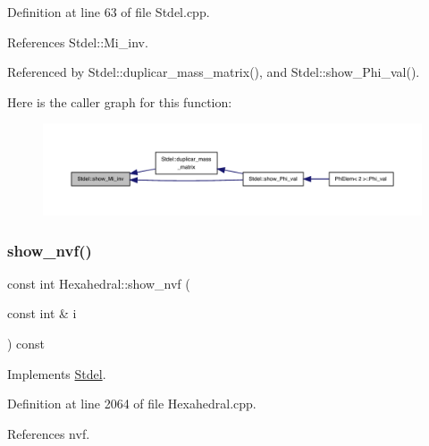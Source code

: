 Definition at line 63 of file Stdel.\+cpp.



References Stdel\+::\+Mi\+\_\+inv.



Referenced by Stdel\+::duplicar\+\_\+mass\+\_\+matrix(), and Stdel\+::show\+\_\+\+Phi\+\_\+val().

Here is the caller graph for this function\+:
\nopagebreak
\begin{figure}[H]
\begin{center}
\leavevmode
\includegraphics[width=350pt]{classStdel_a11bf2897170ada9a9dd8f641a39585e5_icgraph}
\end{center}
\end{figure}
\mbox{\label{classHexahedral_a92b12c1e273117e9cc481e3a7204d90a}} 
\subsubsection{\texorpdfstring{show\+\_\+nvf()}{show\_nvf()}}
{\footnotesize\ttfamily const int Hexahedral\+::show\+\_\+nvf (\begin{DoxyParamCaption}\item[{const int \&}]{i }\end{DoxyParamCaption}) const\hspace{0.3cm}{\ttfamily [virtual]}}



Implements \hyperlink{classStdel_a2a504322269a749dd3c443d0e86c4a6c}{Stdel}.



Definition at line 2064 of file Hexahedral.\+cpp.



References nvf.

\mbox{\label{classStdel_a6565c36150823a1f52a2daf05806f7a4}} 

